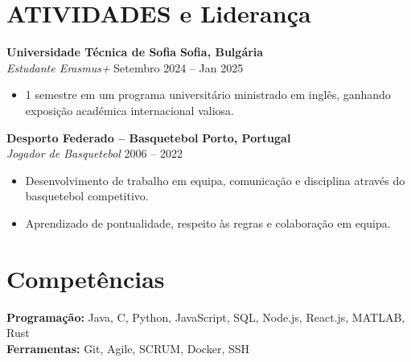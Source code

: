\documentclass[10pt, letterpaper]{article}
\newenvironment{highlights}{
    \begin{itemize}[
        topsep=0.10 cm,
        parsep=0.10 cm,
        partopsep=0pt,
        itemsep=0pt,
        leftmargin=1cm %
    ]
}{
    \end{itemize}
}
\begin{document}
\section{ATIVIDADES e Liderança}
\textbf{Universidade Técnica de Sofia} \hfill \textbf{Sofia, Bulgária} \\
\textit{Estudante Erasmus+} \hfill Setembro 2024 – Jan 2025 \\
\begin{highlights}
    \item 1 semestre em um programa universitário ministrado em inglês, ganhando exposição académica internacional valiosa.
\end{highlights}

\textbf{Desporto Federado – Basquetebol} \hfill \textbf{Porto, Portugal} \\
\textit{Jogador de Basquetebol} \hfill 2006 – 2022 \\
\begin{highlights}
    \item Desenvolvimento de trabalho em equipa, comunicação e disciplina através do basquetebol competitivo.
    \item Aprendizado de pontualidade, respeito às regras e colaboração em equipa.
\end{highlights}

\section{Competências}
\textbf{Programação:} Java, C, Python, JavaScript, SQL, Node.js, React.js, MATLAB, Rust \\
\textbf{Ferramentas:} Git, Agile, SCRUM, Docker, SSH
\end{document}
